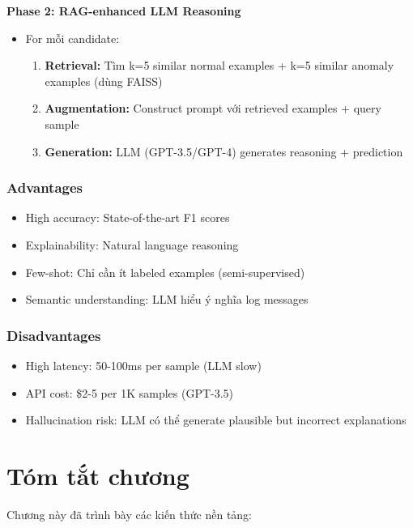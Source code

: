 \textbf{Phase 2: RAG-enhanced LLM Reasoning}
\begin{itemize}
    \item For mỗi candidate:
    \begin{enumerate}
        \item \textbf{Retrieval:} Tìm k=5 similar normal examples + k=5 similar anomaly examples (dùng FAISS)
        \item \textbf{Augmentation:} Construct prompt với retrieved examples + query sample
        \item \textbf{Generation:} LLM (GPT-3.5/GPT-4) generates reasoning + prediction
    \end{enumerate}
\end{itemize}

\subsubsection{Advantages}

\begin{itemize}
    \item High accuracy: State-of-the-art F1 scores
    \item Explainability: Natural language reasoning
    \item Few-shot: Chỉ cần ít labeled examples (semi-supervised)
    \item Semantic understanding: LLM hiểu ý nghĩa log messages
\end{itemize}

\subsubsection{Disadvantages}

\begin{itemize}
    \item High latency: 50-100ms per sample (LLM slow)
    \item API cost: \$2-5 per 1K samples (GPT-3.5)
    \item Hallucination risk: LLM có thể generate plausible but incorrect explanations
\end{itemize}

\section{Tóm tắt chương}

Chương này đã trình bày các kiến thức nền tảng:

